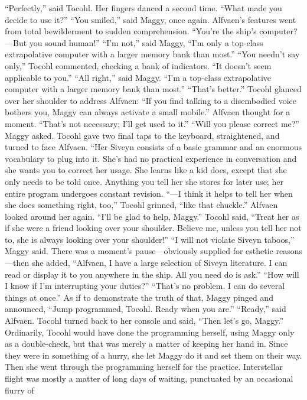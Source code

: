 \documentclass[9pt]{article}
\begin{document}
“Perfectly,” said Tocohl. Her fingers danced a second time. “What made you decide to use it?”
“You smiled,” said Maggy, once again.
Alfvaen’s features went from total bewilderment to sudden comprehension. “You’re the ship’s
computer?—But you sound human!”
“I’m not,” said Maggy, “I’m only a top-class extrapolative computer with a larger memory bank than
most.”
“You needn’t say only,” Tocohl commented, checking a bank of indicators. “It doesn’t seem
applicable to you.”
“All right,” said Maggy. “I’m a top-class extrapolative computer with a larger memory bank than
most.”
“That’s better.” Tocohl glanced over her shoulder to address Alfvaen: “If you find talking to a
disembodied voice bothers you, Maggy can always activate a small mobile.”
Alfvaen thought for a moment. “That’s not necessary; I’ll get used to it.”
“Will you please correct me?” Maggy asked.
Tocohl gave two final taps to the keyboard, straightened, and turned to face Alfvaen. “Her Siveyn
consists of a basic grammar and an enormous vocabulary to plug into it. She’s had no practical
experience in conversation and she wants you to correct her usage. She learns like a kid does, except
that she only needs to be told once. Anything you tell her she stores for later use; her entire program
undergoes constant revision.
“—I think it helps to tell her when she does something right, too,” Tocohl grinned, “like that chuckle.”
Alfvaen looked around her again. “I’ll be glad to help, Maggy.”
Tocohl said, “Treat her as if she were a friend looking over your shoulder. Believe me, unless you tell
her not to, she is always looking over your shoulder!”
“I will not violate Siveyn taboos,” Maggy said. There was a moment’s pause—obviously supplied for
esthetic reasons—then she added, “Alfvaen, I have a large selection of Siveyn literature. I can read or
display it to you anywhere in the ship. All you need do is ask.”
“How will I know if I’m interrupting your duties?”
“That’s no problem. I can do several things at once.” As if to demonstrate the truth of that, Maggy
pinged and announced, “Jump programmed, Tocohl. Ready when you are.”
“Ready,” said Alfvaen. Tocohl turned back to her console and said, “Then let’s go, Maggy.”
Ordinarily, Tocohl would have done the programming herself, using Maggy only as a double-check,
but that was merely a matter of keeping her hand in. Since they were in something of a hurry, she let
Maggy do it and set them on their way. Then she went through the programming herself for the practice.
Interstellar flight was mostly a matter of long days of waiting, punctuated by an occasional flurry of
\end{document}
